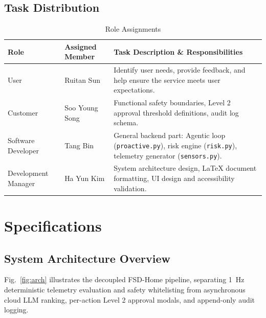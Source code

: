 \documentclass[conference]{IEEEtran}
\begin{document}
\subsection{Task Distribution}
\begin{table}[htbp]
\caption{Role Assignments}
\begin{center}
\begin{tabular}{llp{4.3cm}}
\toprule
\textbf{Role} & \textbf{Assigned Member} & \textbf{Task Description \& Responsibilities} \\
\midrule
User & Ruitan Sun & Identify user needs, provide feedback, and help ensure the service meets user expectations. \\
Customer & Soo Young Song & Functional safety boundaries, Level 2 approval threshold definitions, audit log schema. \\
Software Developer & Tang Bin & General backend part: Agentic loop (\texttt{proactive.py}), risk engine (\texttt{risk.py}), telemetry generator (\texttt{sensors.py}). \\
Development Manager & Ha Yun Kim & System architecture design, LaTeX document formatting, UI design and accessibility validation. \\
\bottomrule
\end{tabular}
\end{center}
\end{table}

\section{Specifications}

\subsection{System Architecture Overview}
Fig.~\ref{fig:arch} illustrates the decoupled FSD-Home pipeline, separating 1~Hz deterministic telemetry evaluation and safety whitelisting from asynchronous cloud LLM ranking, per-action Level 2 approval modals, and append-only audit logging.
\end{document}
